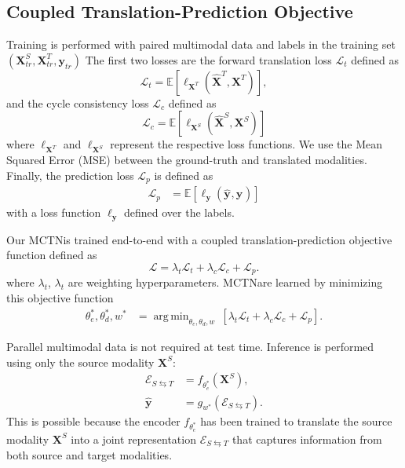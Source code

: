 \documentclass[letterpaper]{article} %
\DeclareMathOperator*{\argmin}{arg\,min}
\newcommand{\ours}{MCTN}
\begin{document}
\subsection{Coupled Translation-Prediction Objective}

Training is performed with paired multimodal data and labels in the training set $(\mathbf{X}^{S}_{tr},\mathbf{X}^{T}_{tr},\mathbf{y}_{tr})$ 
The first two losses are
the forward translation loss $\mathcal{L}_t$ defined as 
\begin{equation}
\mathcal{L}_t = \mathbb{E} [\ell_{\mathbf{X}^{T}}(\hat{\mathbf{X}}^{T}_{},{\mathbf{X}}^{T}_{})],
\label{lt}
\end{equation}
and the cycle consistency loss $\mathcal{L}_c$ defined as
\begin{equation}
\mathcal{L}_c = \mathbb{E} [\ell_{\mathbf{X}^{S}}(\hat{\mathbf{X}}^{S}_{},{\mathbf{X}}^{S}_{})]
\label{lc}
\end{equation}
where 
$\ell_{\mathbf{X}^{T}}$ and $\ell_{\mathbf{X}^{S}}$
represent the respective loss functions. 
We use the Mean Squared Error (MSE) between the ground-truth and translated modalities. Finally, the prediction loss $\mathcal{L}_p$ is defined as
\begin{align}
\mathcal{L}_p &= \mathbb{E} [ \ell_{\mathbf{y}}(\hat{\mathbf{y}}_{},\mathbf{y}_{})]
\label{lp}
\end{align}
with
a loss function $\ell_{\mathbf{y}}$ 
%
defined
over the labels.

Our \ours \model is trained end-to-end with a coupled translation-prediction objective function defined as 
\begin{equation}
\mathcal{L} = \lambda_t \mathcal{L}_t + \lambda_c \mathcal{L}_c + \mathcal{L}_p.
\label{eq:objective}
\end{equation}
where $\lambda_t$, $\lambda_t$ are weighting hyperparameters. \ours \parameters are learned by minimizing this objective function
\begin{align}
\theta_e^*, \theta_d^*, w^* &= \argmin_{\theta_e,\theta_d,w} \ [\lambda_t \mathcal{L}_t + \lambda_c \mathcal{L}_c + \mathcal{L}_p].
\end{align}

Parallel multimodal data is not required at test time. Inference is performed using only the source modality 
$\mathbf{X}^{S}$:
\begin{align}{\mathcal{E}}_{S \leftrightarrows T} &= f_{\theta_e^*}
(\mathbf{X}^{S}), \\
\hat{\mathbf{y}} 
&= g_{w^*}({\mathcal{E}}_{S \leftrightarrows T}).
\end{align}
This is possible because the encoder $f_{\theta_e^*}$ has been trained to translate the source modality $\mathbf{X}^{S}$ into a joint representation ${\mathcal{E}}_{S \leftrightarrows T}$ that captures information from both source and target modalities. 
\end{document}
